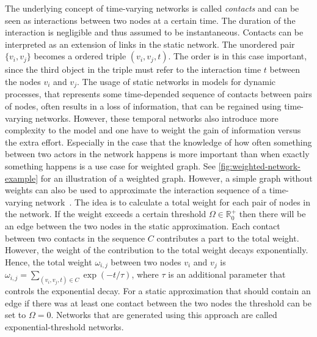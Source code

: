 The underlying concept of time-varying networks is called \emph{contacts} and can be seen as interactions between two nodes at a certain time.
The duration of the interaction is negligible and thus assumed to be instantaneous.
Contacts can be interpreted as an extension of links in the static network.
The unordered pair \(\{v_{i}, v_{j}\}\) becomes a ordered triple \((v_{i}, v_{j}, t)\).
The order is in this case important, since the third object in the triple must refer to the interaction time \(t\) between the nodes \(v_{i}\) and \(v_{j}\).
The usage of static networks in models for dynamic processes, that represents some time-depended sequence of contacts between pairs of nodes, often results in a loss of information, that can be regained using time-varying networks.
However, these temporal networks also introduce more complexity to the model and one have to weight the gain of information versus the extra effort.
Especially in the case that the knowledge of how often something between two actors in the network happens is more important than when exactly something happens is a use case for weighted graph.
See \autoref{fig:weighted-network-example} for an illustration of a weighted graph.
However, a simple graph without weights can also be used to approximate the interaction sequence of a time-varying network~\cite{Holme2013}.
The idea is to calculate a total weight for each pair of nodes in the network.
If the weight exceeds a certain threshold \(\Omega \in \mathbb{R}_{0}^{+}\) then there will be an edge between the two nodes in the static approximation.
Each contact between two contacts in the sequence \(C\) contributes a part to the total weight.
However, the weight of the contribution to the total weight decays exponentially.
Hence, the total weight \(\omega_{i,j}\) between two nodes \(v_{i}\) and \(v_{j}\) is \(\omega_{i,j} = \sum_{(v_{i}, v_{j}, t) \in C} \exp(-t / \tau)\), where \(\tau\) is an additional parameter that controls the exponential decay.
For a static approximation that should contain an edge if there was at least one contact between the two nodes the threshold can be set to \(\Omega = 0\).
Networks that are generated using this approach are called exponential-threshold networks.

